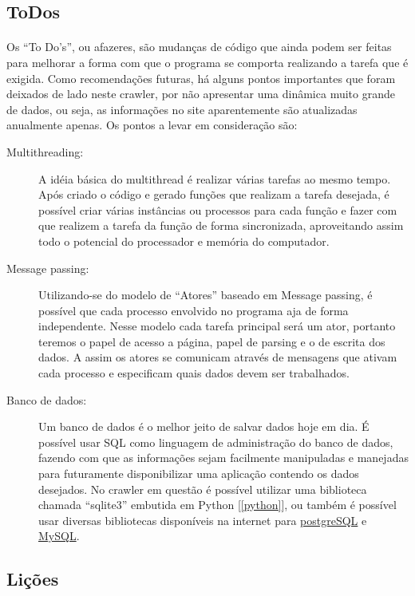 \documentclass[a4paper, 12pt]{article}
\begin{document}
\subsection{ToDos}\label{todos}
\paragraph{}Os ``To Do's'', ou afazeres, são mudanças de código que ainda
podem ser feitas para melhorar a forma com que o programa se comporta
realizando a tarefa que é exigida. Como recomendações futuras, há
alguns pontos importantes que foram deixados de lado neste crawler, por 
não apresentar uma dinâmica muito grande de dados, ou seja, as
informações no site aparentemente são atualizadas anualmente
apenas. Os pontos a levar em consideração são:
\begin{description}
\item[Multithreading\label{multithread}:]{A idéia básica do
    multithread é realizar várias tarefas ao mesmo tempo. Após criado
    o código e gerado funções que realizam a tarefa desejada, é
    possível criar várias instâncias ou processos para cada função e
    fazer com que realizem a tarefa da função de forma
    sincronizada, aproveitando assim todo o potencial do processador e
  memória do computador.}
\item[Message passing\label{message}:]{Utilizando-se do modelo de
    ``Atores'' baseado em Message passing, é possível que cada
    processo envolvido no programa aja de forma independente. Nesse
    modelo cada tarefa principal será um ator, portanto teremos o
    papel de acesso a página, papel de parsing e o de escrita dos
    dados. A assim os atores se comunicam através de mensagens que
    ativam cada processo e especificam quais dados devem ser
    trabalhados.}
\item[Banco de dados\label{banco}:]{Um banco de dados é o melhor jeito
  de salvar dados hoje em dia. É possível usar SQL como linguagem de
  administração do banco de dados, fazendo com que as informações
  sejam facilmente manipuladas e manejadas para futuramente
  disponibilizar uma aplicação contendo os dados desejados. No crawler
em questão é possível utilizar uma biblioteca chamada ``sqlite3''
embutida em Python [\ref{python}], ou também é possível usar diversas
bibliotecas disponíveis na internet para
\href{http://www.pygresql.org/}{postgreSQL} e
\href{http://mysql-python.sourceforge.net/}{MySQL}. }
\end{description}

\subsection{Lições}\label{lessons}
\end{document}
